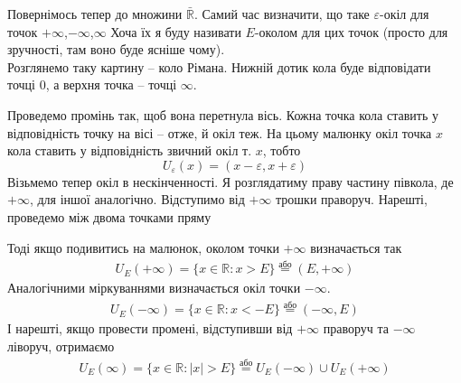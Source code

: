 \documentclass[a4paper, 14pt]{article}
\theoremstyle{theoremdd}
\theoremstyle{theoremdd}
\theoremstyle{theoremdd}
\theoremstyle{theoremdd}
\theoremstyle{theoremdd}
\theoremstyle{theoremdd}
\theoremstyle{theoremdd}
\theoremstyle{theoremdd}
\begin{document}
Повернімось тепер до множини $\bar{\mathbb{R}}$. Самий час визначити, що таке $\varepsilon$-окіл для точок $+\infty$,$-\infty$,$\infty$ Хоча їх я буду називати $E$-околом для цих точок (просто для зручності, там воно буде ясніше чому).\\
Розглянемо таку картину -- коло Рімана. Нижній дотик кола буде відповідати точці $0$, а верхня точка -- точці $\infty$.
	\begin{figure}[H]
	\centering
	\end{figure}
	Проведемо промінь так, щоб вона перетнула вісь. Кожна точка кола ставить у відповідність точку на вісі -- отже, й окіл теж. На цьому малюнку окіл точка $x$ кола ставить у відповідність звичний окіл т. $x$, тобто $$U_{\varepsilon}(x) = (x-\varepsilon,x+\varepsilon)$$
	Візьмемо тепер окіл в нескінченності. Я розглядатиму праву частину півкола, де $+\infty$, для іншої аналогічно. Відступимо від $+\infty$ трошки праворуч. Нарешті, проведемо між двома точками пряму\\
	\begin{figure}[H]
	\centering
	\resizebox{1.1\textwidth}{!} {
	}
	\end{figure}
	Тоді якщо подивитись на малюнок, околом точки $+\infty$ визначається так
	\begin{align*}
	U_{E}(+\infty) = \{x \in \mathbb{R}: x > E\} \overset{\text{або}}{=} (E,+\infty)
	\end{align*}
	Аналогічними міркуваннями визначається окіл точки $-\infty$.
	\begin{align*}
	U_{E}(-\infty) = \{x \in \mathbb{R}: x < -E\} \overset{\text{або}}{=} (-\infty, E)
	\end{align*}
	І нарешті, якщо провести промені, відступивши від $+\infty$ праворуч та $-\infty$ ліворуч, отримаємо
	\begin{align*}
	U_{E}(\infty) = \{x \in \mathbb{R}: |x| > E\} \overset{\text{або}}{=} U_{E}(-\infty) \cup U_E(+\infty)
	\end{align*}
	
\end{document}
